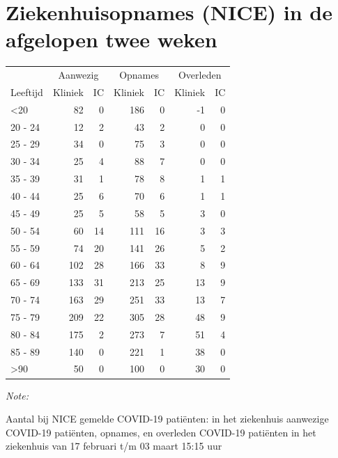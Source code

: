 \documentclass[
  english,
  man,floatsintext]{apa6}
\begin{document}
\newpage

\hypertarget{ziekenhuisopnames-nice-in-de-afgelopen-twee-weken}{%
\section{Ziekenhuisopnames (NICE) in de afgelopen twee weken}\label{ziekenhuisopnames-nice-in-de-afgelopen-twee-weken}}

\begin{table}
\centering\begingroup\fontsize{10}{12}\selectfont

\begin{threeparttable}
\begin{tabular}{lrrrrrr}
\toprule
\multicolumn{1}{c}{ } & \multicolumn{2}{c}{Aanwezig} & \multicolumn{2}{c}{Opnames} & \multicolumn{2}{c}{Overleden} \\
\cmidrule(l{3pt}r{3pt}){2-3} \cmidrule(l{3pt}r{3pt}){4-5} \cmidrule(l{3pt}r{3pt}){6-7}
Leeftijd & Kliniek & IC & Kliniek & IC & Kliniek & IC\\
\midrule
<20 & 82 & 0 & 186 & 0 & -1 & 0\\
20 - 24 & 12 & 2 & 43 & 2 & 0 & 0\\
25 - 29 & 34 & 0 & 75 & 3 & 0 & 0\\
30 - 34 & 25 & 4 & 88 & 7 & 0 & 0\\
35 - 39 & 31 & 1 & 78 & 8 & 1 & 1\\
40 - 44 & 25 & 6 & 70 & 6 & 1 & 1\\
45 - 49 & 25 & 5 & 58 & 5 & 3 & 0\\
50 - 54 & 60 & 14 & 111 & 16 & 3 & 3\\
55 - 59 & 74 & 20 & 141 & 26 & 5 & 2\\
60 - 64 & 102 & 28 & 166 & 33 & 8 & 9\\
65 - 69 & 133 & 31 & 213 & 25 & 13 & 9\\
70 - 74 & 163 & 29 & 251 & 33 & 13 & 7\\
75 - 79 & 209 & 22 & 305 & 28 & 48 & 9\\
80 - 84 & 175 & 2 & 273 & 7 & 51 & 4\\
85 - 89 & 140 & 0 & 221 & 1 & 38 & 0\\
>90 & 50 & 0 & 100 & 0 & 30 & 0\\
\bottomrule
\end{tabular}
\begin{tablenotes}
\item \textit{Note: } 
\item Aantal bij NICE gemelde COVID-19 patiënten: in het ziekenhuis aanwezige COVID-19 patiënten, opnames, en overleden COVID-19 patiënten in het ziekenhuis van 17 februari t/m 03 maart 15:15 uur
\end{tablenotes}
\end{threeparttable}
\endgroup{}
\end{table}
\end{document}
